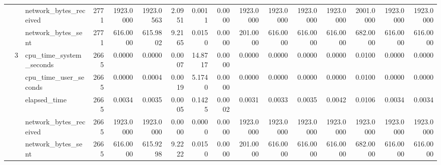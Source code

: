 \begin{tabular}{lllrrrrrrrrrrrrr}
 &  & network\_bytes\_received & 2771 & 1923.0000 & 1923.0563 & 2.0951 & 0.0011 & 0.0000 & 1923.0000 & 1923.0000 & 1923.0000 & 1923.0000 & 2001.0000 & 1923.0000 & 1923.0000 \\
 &  & network\_bytes\_sent & 2771 & 616.0000 & 615.9802 & 9.2165 & 0.0150 & 0.0000 & 201.0000 & 616.0000 & 616.0000 & 616.0000 & 682.0000 & 616.0000 & 616.0000 \\
\cline{2-16}
 & \multirow[t]{5}{*}{3} & cpu\_time\_system\_seconds & 2665 & 0.0000 & 0.0000 & 0.0007 & 14.8717 & 0.0000 & 0.0000 & 0.0000 & 0.0000 & 0.0000 & 0.0100 & 0.0000 & 0.0000 \\
 &  & cpu\_time\_user\_seconds & 2665 & 0.0000 & 0.0004 & 0.0019 & 5.1740 & 0.0000 & 0.0000 & 0.0000 & 0.0000 & 0.0000 & 0.0100 & 0.0000 & 0.0000 \\
 &  & elapsed\_time & 2665 & 0.0034 & 0.0035 & 0.0005 & 0.1425 & 0.0002 & 0.0031 & 0.0033 & 0.0035 & 0.0042 & 0.0106 & 0.0034 & 0.0034 \\
 &  & network\_bytes\_received & 2665 & 1923.0000 & 1923.0000 & 0.0000 & 0.0000 & 0.0000 & 1923.0000 & 1923.0000 & 1923.0000 & 1923.0000 & 1923.0000 & 1923.0000 & 1923.0000 \\
 &  & network\_bytes\_sent & 2665 & 616.0000 & 615.9298 & 9.2222 & 0.0150 & 0.0000 & 201.0000 & 616.0000 & 616.0000 & 616.0000 & 682.0000 & 616.0000 & 616.0000 \\
\cline{1-16} \cline{2-16}
\bottomrule
\end{tabular}
